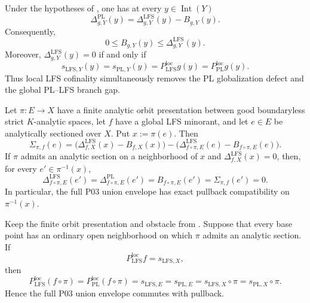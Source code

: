 \begin{theorem}
\label{thm:p031-pl-lfs-defect-split}
Under the hypotheses of
, one has at every
$y\in\operatorname{Int}(Y)$
\begin{equation}
\label{eq:p031-pl-lfs-defect-split}
 \Delta^{\mathrm{PL}}_{g,Y}(y)
   =\Delta^{\mathrm{LFS}}_{g,Y}(y)-B_{g,Y}(y).
\end{equation}
Consequently,
\begin{equation}
\label{eq:p031-branch-gap-globalization-bound}
             0\leq B_{g,Y}(y)
                \leq\Delta^{\mathrm{LFS}}_{g,Y}(y).
\end{equation}
Moreover, $\Delta^{\mathrm{LFS}}_{g,Y}(y)=0$ if and only if
\begin{equation}
\label{eq:p031-lfs-zero-four-envelope-collapse}
 s_{\mathrm{LFS},Y}(y)
  =s_{\mathrm{PL},Y}(y)
  =P_{\mathrm{LFS}}^{\mathrm{loc}}g(y)
  =P_{\mathrm{PL}}^{\mathrm{loc}}g(y).
\end{equation}
Thus local LFS cofinality simultaneously removes the PL globalization
defect and the global PL--LFS branch gap.
\end{theorem}

\begin{corollary}
\label{cor:p031-sectioned-four-defect-balance}
Let $\pi:E\to X$ have a finite analytic orbit presentation between good
boundaryless strict $K$-analytic spaces, let $f$ have a global LFS
minorant, and let $e\in E$ be analytically sectioned over $X$.  Put
$x:=\pi(e)$.  Then
\begin{equation}
\label{eq:p031-sectioned-four-defect-balance}
 \Sigma_{\pi,f}(e)
  =\bigl(\Delta^{\mathrm{LFS}}_{f,X}(x)-B_{f,X}(x)\bigr)
   -\bigl(
      \Delta^{\mathrm{LFS}}_{f\circ\pi,E}(e)
        -B_{f\circ\pi,E}(e)
    \bigr).
\end{equation}
If $\pi$ admits an analytic section on a neighborhood of $x$ and
$\Delta^{\mathrm{LFS}}_{f,X}(x)=0$, then, for every
$e'\in\pi^{-1}(x)$,
\[
 \Delta^{\mathrm{LFS}}_{f\circ\pi,E}(e')
  =\Delta^{\mathrm{PL}}_{f\circ\pi,E}(e')
  =B_{f\circ\pi,E}(e')
  =\Sigma_{\pi,f}(e')=0.
\]
In particular, the full P03 union envelope has exact pullback compatibility
on $\pi^{-1}(x)$.
\end{corollary}

\begin{corollary}
\label{cor:p031-global-lfs-cofinality-closes-orbit-cover}
Keep the finite orbit presentation and obstacle from
.  Suppose that every base
point has an ordinary open neighborhood on which $\pi$ admits an analytic
section.  If
\[
            P_{\mathrm{LFS}}^{\mathrm{loc}}f=s_{\mathrm{LFS},X},
\]
then
\begin{equation}
\label{eq:p031-global-lfs-cofinality-collapse}
 P_{\mathrm{LFS}}^{\mathrm{loc}}(f\circ\pi)
  =P_{\mathrm{PL}}^{\mathrm{loc}}(f\circ\pi)
  =s_{\mathrm{LFS},E}
  =s_{\mathrm{PL},E}
  =s_{\mathrm{LFS},X}\circ\pi
  =s_{\mathrm{PL},X}\circ\pi.
\end{equation}
Hence the full P03 union envelope commutes with pullback.
\end{corollary}
